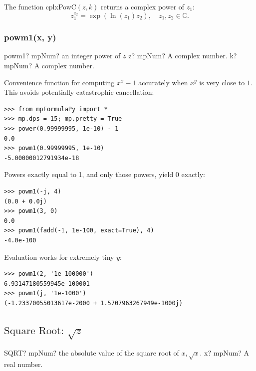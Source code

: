 \vspace{0.3cm}
The function \textsf{cplxPowC$(z, k)$} returns a complex power of $z_1$: 
\begin{equation}
	z_1^{z_2} = \exp(\ln(z_1) z_2) , \quad  z_1, z_2 \in  \mathbb{C}.
\end{equation}


\subsubsection{powm1(x, y)}


\begin{mpFunctionsExtract}
	\mpFunctionTwo
	{powm1? mpNum? an integer power of $z$}
	{z? mpNum? A complex number.}
	{k? mpNum?  A complex number.}
\end{mpFunctionsExtract}


Convenience function for computing $x^{x}-1$ accurately when $x^y$ is very close to $1$. This avoids potentially catastrophic cancellation:

\begin{lstlisting}
>>> from mpFormulaPy import *
>>> mp.dps = 15; mp.pretty = True
>>> power(0.99999995, 1e-10) - 1
0.0
>>> powm1(0.99999995, 1e-10)
-5.00000012791934e-18
\end{lstlisting}


Powers exactly equal to 1, and only those powers, yield 0 exactly:
\begin{lstlisting}
>>> powm1(-j, 4)
(0.0 + 0.0j)
>>> powm1(3, 0)
0.0
>>> powm1(fadd(-1, 1e-100, exact=True), 4)
-4.0e-100
\end{lstlisting}


Evaluation works for extremely tiny $y$:
\begin{lstlisting}
>>> powm1(2, '1e-100000')
6.93147180559945e-100001
>>> powm1(j, '1e-1000')
(-1.23370055013617e-2000 + 1.5707963267949e-1000j)
\end{lstlisting}





\newpage
\subsection{\texorpdfstring{$\text{Square Root: }\sqrt{z}$}{sqrt}}


\begin{mpFunctionsExtract}
	\mpWorksheetFunctionOneNotImplemented
	{SQRT? mpNum? the absolute value of the square root of $x, \sqrt{x}$.}
	{x? mpNum? A real number.}
\end{mpFunctionsExtract}


